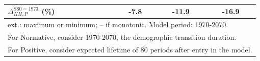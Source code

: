 \begin{table}[htbp]
\begin{tabular}{l ccc ccc ccc}
\(\Delta_{KH,P}^{\mathrm{SS0=1973}}\) (\%) & \multicolumn{3}{c}{-7.8} & \multicolumn{3}{c}{-11.9} & \multicolumn{3}{c}{-16.9} \\
\bottomrule
\multicolumn{10}{l}{\footnotesize ext.: maximum or minimum; -- if monotonic. Model period: 1970-2070.} \\
\multicolumn{10}{l}{\footnotesize For Normative, consider 1970-2070, the demographic transition duration.} \\
\multicolumn{10}{l}{\footnotesize For Positive, consider expected lifetime of 80 periods after entry in the model.} \\
\end{tabular}
\end{table}

